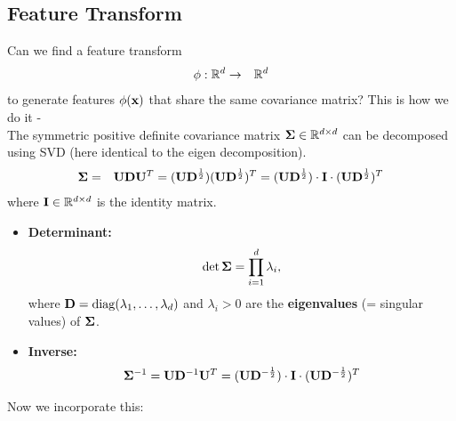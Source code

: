  \subsection{Feature Transform}
  Can we find a feature transform
  \begin{eqnarray*}
    \phi: \mathbb{R}^d &\rightarrow &\mathbb{R}^d
   \end{eqnarray*}
  to generate features $\phi(\bm{\mathrm{x}})$ that share the same covariance matrix?  This is how we do it -\\
   The symmetric positive definite covariance matrix $\mathbf{\Sigma}\in \mathbb{R}^{d\times d}$ can be decomposed using SVD (here identical to the eigen decomposition).\autocite{trefethen1997,golub1996}
%  
  \begin{eqnarray*}
    \mathbf{\Sigma}&=&  \mathbf{U}\mathbf{D}\mathbf{U}^T = (\mathbf{U}\mathbf{D}^{\frac{1}{2}})(\mathbf{U}\mathbf{D}^{\frac{1}{2}})^T  =      (\mathbf{U}\mathbf{D}^{\frac{1}{2}})\cdot \mathbf{I} \cdot(\mathbf{U}\mathbf{D}^{\frac{1}{2}})^T
  \end{eqnarray*}
  where $\mathbf{I}\in \mathbb{R}^{d\times d}$ is the identity matrix.
 
  \begin{itemize}
    \item \textbf{Determinant:}  
      \begin{displaymath}
        \det \mathbf{\Sigma} = \prod_{i=1}^d \lambda_i,
      \end{displaymath}
      where $\mathbf{D}=\mathrm{diag}(\lambda_1,\dots,\lambda_d)$ and $\lambda_i>0$ are the \textbf{eigenvalues} (= singular values) of $\mathbf{\Sigma}$.
    \item \textbf{Inverse:}
      \begin{displaymath}
        \mathbf{\Sigma}^{-1} = \mathbf{U}\mathbf{D}^{-1}\mathbf{U}^T
                          = (\mathbf{U}\mathbf{D}^{-\frac{1}{2}})\cdot \mathbf{I} \cdot(\mathbf{U}\mathbf{D}^{-\frac{1}{2}})^T
      \end{displaymath}
  \end{itemize}
     Now we incorporate this:
   
